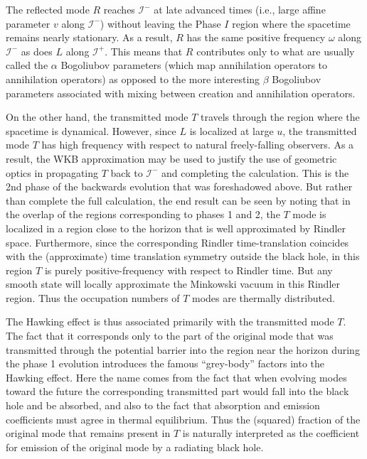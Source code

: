 \documentclass[letterpaper,12pt]{article}
\newcommand*{\scri}{\mathscr{I}} %
\begin{document}
The reflected mode $R$ reaches $\scri^-$ at late advanced times (i.e., large affine parameter $v$ along $\scri^-$) without leaving the Phase $I$ region where the spacetime remains nearly stationary.  As a result, $R$ has the same positive frequency $\omega$ along $\scri^-$ as does $L$ along $\scri^+$.  This means that $R$ contributes only to what are usually called the $\alpha$ Bogoliubov parameters (which map annihilation operators to annihilation operators) as opposed to the more interesting $\beta$ Bogoliubov parameters associated with mixing between creation and annihilation operators.

On the other hand, the transmitted mode $T$ travels through the region where the spacetime is dynamical.   However, since $L$ is localized at large $u$, the transmitted mode $T$ has high frequency with respect to natural freely-falling observers.  As a result,
the WKB approximation may be used to justify the use of geometric optics in propagating $T$ back to $\scri^-$ and completing the calculation.  This is the 2nd phase of the backwards evolution that was foreshadowed above.   But rather than complete the full calculation, the end result can be seen \cite{Jacobson:2003vx} by noting that in the overlap of the regions corresponding to phases 1 and 2, the $T$ mode is localized in a region close to the horizon that is well approximated by Rindler space.  Furthermore, since the corresponding Rindler time-translation coincides with the (approximate) time translation symmetry outside the black hole, in this region $T$ is purely positive-frequency with respect to Rindler time.  But any smooth state will locally approximate the Minkowski vacuum in this Rindler region.  Thus the occupation numbers of $T$ modes are thermally distributed.

The Hawking effect is thus associated primarily with the transmitted mode $T$.  The fact that it corresponds only to the part of the original mode that was transmitted through the potential barrier into the region near the horizon during the phase 1 evolution introduces the famous ``grey-body'' factors into the Hawking effect.  Here the name comes from the fact that when evolving modes toward the future the corresponding transmitted part would fall into the black hole and be absorbed, and also to the fact that absorption and emission coefficients must agree in thermal equilibrium.  Thus the (squared) fraction of the original mode that remains present in $T$ is naturally interpreted as the coefficient for emission of the original mode by a radiating black hole.
\end{document}
